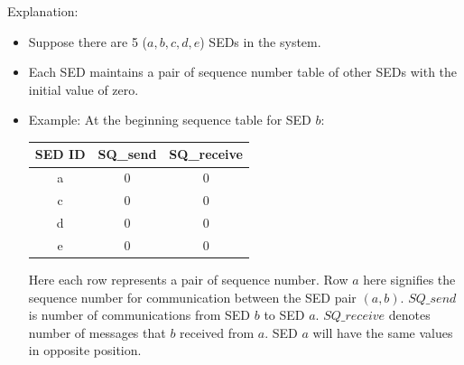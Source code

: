 \documentclass[11pt,oneside,onecolumn,letterpaper]{article}
\begin{document}
Explanation:
  \begin{itemize}
  \item Suppose there are 5 ($a, b, c, d, e$) SEDs in the system.
  \item Each SED maintains a pair of sequence number table of other SEDs with the initial value of zero.
  \item  Example: At the beginning sequence table for SED $b$:

    \begin{center}
  \begin{tabular}{ |c|c|c| } 
   \hline
  \textbf{SED ID} & \textbf{SQ\_send} & \textbf{SQ\_receive}\\
 	\hline \hline
 	a & 0 & 0 \\ 
	c & 0 & 0 \\ 
 	d & 0 & 0 \\ 
 	e & 0 & 0 \\ 
	 \hline
\end{tabular}
\end{center}
Here each row represents a pair of sequence number.
Row $a$ here signifies the sequence number for communication between the SED pair $(a,b)$. $SQ\_send$ is number of communications from SED $b$  to SED $a$. $SQ\_receive$ denotes number of messages that $b$ received from $a$. SED $a$ will have the same values in opposite position.


\end{itemize}
\end{document}
